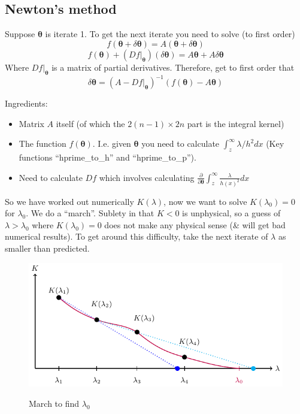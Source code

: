 \documentclass{article}
\newcommand{\bs}{\boldsymbol}                               %
\begin{document}
\subsection*{Newton's method}
Suppose $\bs{\theta}$ is iterate 1. To get the next iterate you need to solve 
(to first order)
\[ f(\bs{\theta}+\delta\bs{\theta}) = A(\bs{\theta}+\delta \bs{\theta})\]
\[ f(\bs{\theta}) + (Df|_{\bs{\theta}})(\delta\bs{\theta}) = A\bs{\theta}+
A\delta \bs{\theta}\]
Where $Df|_{\bs{\theta}}$ is a matrix of partial derivatives. Therefore, get to 
first order that 
\[ \delta \bs{\theta} =  (A-Df|_{\bs{\theta}})^{-1}(f(\bs{\theta}) - A\bs{\theta}) \]

Ingredients:
\begin{itemize}
\item Matrix $A$ itself (of which the $2(n-1)\times2n$ part is the integral
      kernel)
\item The function $f(\bs{\theta})$. I.e. given $\bs{\theta}$ you need to calculate
      $\int_z^{\infty}\lambda/h^2 dx$ (Key functions ``hprime\_to\_h'' and
      ``hprime\_to\_p'').
\item Need to calculate $Df$ which involves calculating $\displaystyle \frac
      {\partial} {\partial \bs{\theta}} \int_z^{\infty} \frac{\lambda}{h(x)^2}dx$

\end{itemize}
So we have worked out numerically $K(\lambda)$, now we want to solve 
$K(\lambda_0)=0$ for $\lambda_0$. We do a ``march''. Sublety in that $K<0$ is 
unphysical, so a guess of $\lambda>\lambda_0$ where $K(\lambda_0)=0$ does
not make any physical sense (\& will get bad numerical results). To get 
around this difficulty, take the next iterate of $\lambda$ as smaller than
predicted.
\begin{figure}[!ht]\centering
\caption{March to find $\lambda_0$}
\includegraphics{NumFig1.pdf}\label{March}
\end{figure}
\end{document}
